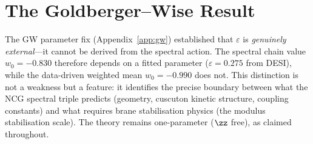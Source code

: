 \section{The Goldberger--Wise Result}
\label{app:val-gw-note}

The GW parameter fix (Appendix~\ref{app:gw}) established that $\varepsilon$ is \emph{genuinely external}---it cannot be derived from the spectral action. The spectral chain value $w_0 = -0.830$ therefore depends on a fitted parameter ($\varepsilon = 0.275$ from DESI), while the data-driven weighted mean $w_0 = -0.990$ does not. This distinction is not a weakness but a feature: it identifies the precise boundary between what the NCG spectral triple predicts (geometry, cuscuton kinetic structure, coupling constants) and what requires brane stabilisation physics (the modulus stabilisation scale). The theory remains one-parameter ($\zz$ free), as claimed throughout.
